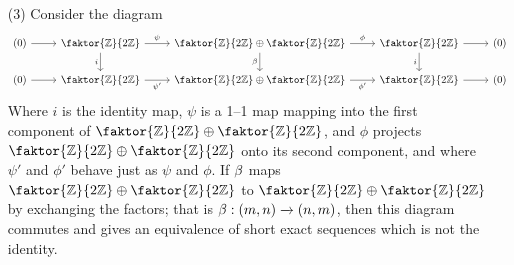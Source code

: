 \begin{example}
\begin{enumerate}
        \item[(3)] Consider the diagram
            \begin{equation*}
\begin{tikzcd}
	{(0)} & {\faktor{\Z}{2\Z}} & {\faktor{\Z}{2\Z} \oplus \faktor{\Z}{2\Z}} &
                                {\faktor{\Z}{2\Z}} & {(0)} \\
	{(0)} & {\faktor{\Z}{2\Z}} & {\faktor{\Z}{2\Z} \oplus \faktor{\Z}{2\Z}} &
                                {\faktor{\Z}{2\Z}} & {(0)}
	\arrow["\psi", from=1-2, to=1-3]
	\arrow["\phi", from=1-3, to=1-4]
	\arrow[from=1-4, to=1-5]
	\arrow[from=2-1, to=2-2]
	\arrow["{\psi'}"', from=2-2, to=2-3]
	\arrow["{\phi'}"', from=2-3, to=2-4]
	\arrow[from=2-4, to=2-5]
	\arrow["i"', from=1-4, to=2-4]
	\arrow["\beta"', from=1-3, to=2-3]
	\arrow["i"', from=1-2, to=2-2]
	\arrow[from=1-1, to=1-2]
\end{tikzcd}
            \end{equation*}
            Where $i$  is the identity map, $\psi$ is a 1--1 map mapping into the
            first component of $\faktor{\Z}{2\Z} \oplus \faktor{\Z}{2\Z}$, and
            $\phi$ projects $\faktor{\Z}{2\Z} \oplus \faktor{\Z}{2\Z}$ onto its
            second component, and where $\psi'$ and  $\phi'$ behave just as  $\psi$
            and  $\phi$. If $\beta$ maps $\faktor{\Z}{2\Z} \oplus \faktor{\Z}{2\Z}$
            to $\faktor{\Z}{2\Z} \oplus \faktor{\Z}{2\Z}$ by exchanging the
            factors; that is  $\beta:(m,n) \xrightarrow{} (n,m)$, then this diagram
            commutes and gives an equivalence of short exact sequences which is
            not the identity.
    \end{enumerate}
\end{example}

